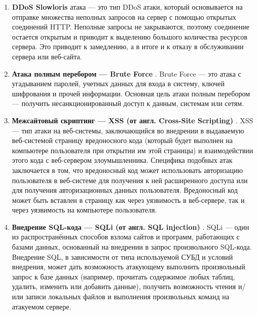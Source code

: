 \begin{enumerate}
    \item \textbf{DDoS Slowloris} атака --- это тип DDoS атаки, который основывается на отправке множества неполных запросов на сервер с помощью открытых соединений HTTP. Неполные запросы не закрываются, поэтому соединение остается открытым и приводит к выделению большого количества ресурсов сервера. Это приводит к замедлению, а в итоге и к отказу в обслуживании сервера или веб-сайта.
    \item \textbf{Атака полным перебором --- Brute Force } \cite{seventh}. Brute Force --- это атака с угадыванием паролей, учетных данных для входа в систему, ключей шифрования и прочей информации. Основная цель атаки полным перебором --- получить несанкционированный доступ к данным, системам или сетям.
    \item \textbf{Межсайтовый скриптинг --- XSS (от англ. Cross-Site Scripting)} \cite{sixtheen}. XSS --- тип атаки на веб-системы, заключающийся во внедрении в выдаваемую веб-системой страницу вредоносного кода (который будет выполнен на компьютере пользователя при открытии им этой страницы) и взаимодействии этого кода с веб-сервером злоумышленника. Специфика подобных атак заключается в том, что вредоносный код может использовать авторизацию пользователя в веб-системе для получения к ней расширенного доступа или для получения авторизационных данных пользователя. Вредоносный код может быть вставлен в страницу как через уязвимость в веб-сервере, так и через уязвимость на компьютере пользователя.
    \item \textbf{Внедрение SQL-кода --- SQLi (от англ. SQL injection)} \cite{sixtheen}. SQLi --- один из распространённых способов взлома сайтов и программ, работающих с базами данных, основанный на внедрении в запрос произвольного SQL-кода. Внедрение SQL, в зависимости от типа используемой СУБД и условий внедрения, может дать возможность атакующему выполнить произвольный запрос к базе данных (например, прочитать содержимое любых таблиц, удалить, изменить или добавить данные), получить возможность чтения и/или записи локальных файлов и выполнения произвольных команд на атакуемом сервере.

\end{enumerate}
